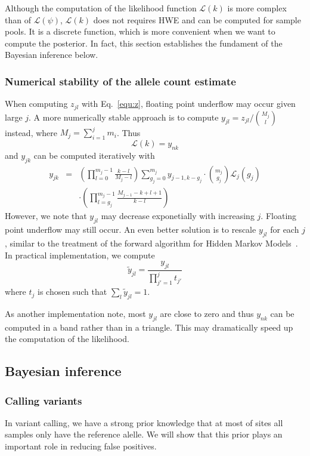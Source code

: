 \documentclass{bioinfo}
\begin{document}
\begin{methods}
Although the computation of the likelihood function $\mathcal{L}(k)$ is
more complex than of $\mathcal{L}(\psi)$, $\mathcal{L}(k)$ does not requires
HWE and can be computed for sample pools. It is a discrete function, which
is more convenient when we want to compute the posterior. In fact,
this section establishes the fundament of the Bayesian inference below.

\subsubsection{Numerical stability of the allele count estimate}
When computing $z_{jl}$ with Eq.~\eqref{equ:z}, floating point
underflow may occur given large $j$. A more numerically stable approach is to
compute $y_{jl}=z_{jl}/\binom{M_j}{l}$ instead, where
$M_j=\sum_{i=1}^j m_i$. Thus
\begin{equation}\label{equ:klky}
\mathcal{L}(k)=y_{nk}
\end{equation}
and $y_{jk}$ can be computed iteratively with
\begin{eqnarray}\label{equ:y}
y_{jk}&=&\left(\prod_{l=0}^{m_j-1}\frac{k-l}{M_{j}-l}\right)\sum_{g_j=0}^{m_j}y_{j-1,k-g_j}\cdot\binom{m_j}{g_j}\mathcal{L}_j(g_j)\\\nonumber
	&&\cdot\left(\prod_{l=g_j}^{m_j-1}\frac{M_{j-1}-k+l+1}{k-l}\right)
\end{eqnarray}
However, we note that $y_{jl}$ may decrease exponetially with increasing $j$. Floating point underflow
may still occur. An even better solution is to
rescale $y_{jl}$ for each $j$, similar to the treatment of the forward algorithm
for Hidden Markov Models~\citep{Durbin:1998uq}. In practical implementation,
we compute
\begin{equation}
\tilde{y}_{jl}=\frac{y_{jl}}{\prod_{j'=1}^jt_{j'}}
\end{equation}
where $t_{j}$ is chosen such that $\sum_{l}\tilde{y}_{jl}=1$.

As another implementation note, most $y_{jl}$ are close to zero and
thus $y_{nk}$ can be computed in a band rather than in a triangle. This
may dramatically speed up the computation of the likelihood.

\subsection{Bayesian inference}

\subsubsection{Calling variants}
In variant calling, we have a strong prior knowledge that at most of sites all samples only
have the reference alelle. We will show that this prior plays an important role
in reducing false positives.


\end{methods}
\end{document}
